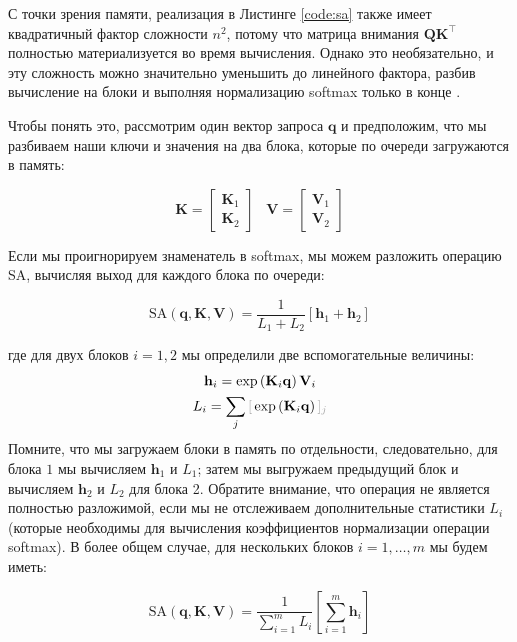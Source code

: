 С точки зрения памяти, реализация в Листинге \ref{code:sa} также имеет квадратичный фактор сложности $n^2$, потому что матрица внимания $\mathbf{Q}\mathbf{K}^\top$ полностью материализуется во время вычисления. Однако это необязательно, и эту сложность можно значительно уменьшить до линейного фактора, разбив вычисление на блоки и выполняя нормализацию softmax только в конце \cite{rabe2021self}. 

Чтобы понять это, рассмотрим один вектор запроса $\mathbf{q}$ и предположим, что мы разбиваем наши ключи и значения на два блока, которые по очереди загружаются в память:

\begin{equation}
\mathbf{K} = \begin{bmatrix}\mathbf{K}_1 \\ \mathbf{K}_2 \end{bmatrix} \;\;\; \mathbf{V} = \begin{bmatrix}\mathbf{V}_1 \\ \mathbf{V}_2 \end{bmatrix}
\end{equation}

Если мы проигнорируем знаменатель в softmax, мы можем разложить операцию SA, вычисляя выход для каждого блока по очереди:

\begin{equation}
\text{SA}(\mathbf{q}, \mathbf{K}, \mathbf{V}) = \frac{1}{L_1 + L_2} \left[ \mathbf{h}_1 + \mathbf{h}_2 \right]
\label{eq:attention_two_chunks}
\end{equation}

где для двух блоков $i=1,2$ мы определили две вспомогательные величины:
%
\begin{gather}
\mathbf{h}_i = \exp\left( \mathbf{K}_i\mathbf{q} \right)\mathbf{V}_i  \\
L_i = \sum_j \idx{\exp\left( \mathbf{K}_i\mathbf{q} \right)}{j}
\end{gather}
%
Помните, что мы загружаем блоки в память по отдельности, следовательно, для блока $1$ мы вычисляем $\mathbf{h}_1$ и $L_1$; затем мы выгружаем предыдущий блок и вычисляем $\mathbf{h}_2$ и $L_2$ для блока 2. Обратите внимание, что операция не является полностью разложимой, если мы не отслеживаем дополнительные статистики $L_i$ (которые необходимы для вычисления коэффициентов нормализации операции softmax). В более общем случае, для нескольких блоков $i=1, \ldots, m$ мы будем иметь:

\begin{equation}
\text{SA}(\mathbf{q}, \mathbf{K}, \mathbf{V}) = \frac{1}{\sum_{i=1}^m L_i} \left[ \sum_{i=1}^m \mathbf{h}_i\right]
\label{eq:chunked_sa}
\end{equation}

